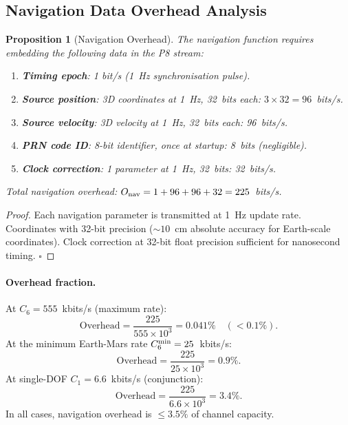 \documentclass[aps,prd,twocolumn,superscriptaddress,nofootinbib]{revtex4-2}
\newtheorem{proposition}[theorem]{Proposition}
\begin{document}
\subsection{Navigation Data Overhead Analysis}

\begin{proposition}[Navigation Overhead]
\label{prop:nav-overhead}
The navigation function requires embedding the following data in the P8 stream:
\begin{enumerate}
\item \textbf{Timing epoch}: 1 bit/s (1~Hz synchronisation pulse).
\item \textbf{Source position}: 3D coordinates at 1~Hz, 32~bits each: $3 \times 32 = 96$~bits/s.
\item \textbf{Source velocity}: 3D velocity at 1~Hz, 32~bits each: 96~bits/s.
\item \textbf{PRN code ID}: 8-bit identifier, once at startup: 8~bits (negligible).
\item \textbf{Clock correction}: 1 parameter at 1~Hz, 32~bits: 32~bits/s.
\end{enumerate}
Total navigation overhead: $O_{\rm nav} = 1 + 96 + 96 + 32 = 225$~bits/s.
\end{proposition}

\begin{proof}
Each navigation parameter is transmitted at 1~Hz update rate.
Coordinates with 32-bit precision ($\sim 10$~cm absolute accuracy for
Earth-scale coordinates). Clock correction at 32-bit float precision
sufficient for nanosecond timing. $\square$
\end{proof}

\paragraph{Overhead fraction.}
At $C_6 = 555$~kbits/s (maximum rate):
\begin{equation}
\text{Overhead} = \frac{225}{555\times10^3} = 0.041\% \quad (< 0.1\%).
\end{equation}
At the minimum Earth-Mars rate $C_6^{\rm min} = 25$~kbits/s:
\begin{equation}
\text{Overhead} = \frac{225}{25\times10^3} = 0.9\%.
\end{equation}
At single-DOF $C_1 = 6.6$~kbits/s (conjunction):
\begin{equation}
\text{Overhead} = \frac{225}{6.6\times10^3} = 3.4\%.
\end{equation}
In all cases, navigation overhead is $\leq 3.5\%$ of channel capacity.
\end{document}
